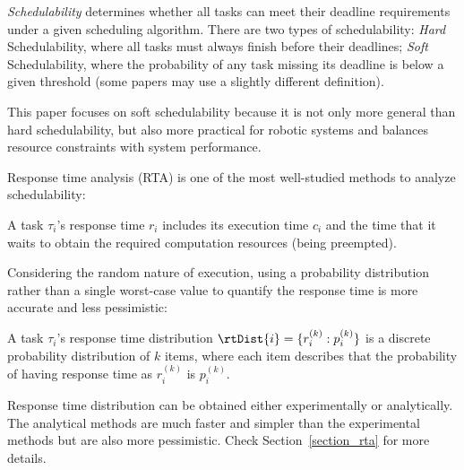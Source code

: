     \textit{Schedulability} determines whether all tasks can meet their deadline requirements under a given scheduling algorithm.
    There are two types of schedulability: \textit{Hard} Schedulability, where all tasks must always finish before their deadlines;
    \textit{Soft} Schedulability, where the probability of any task missing its deadline is below a given threshold (some papers may use a slightly different definition).
    
	This paper focuses on soft schedulability because it is not only more general than hard schedulability, but also more practical for robotic systems and balances resource constraints with system performance.
    
	
	Response time analysis (RTA) is one of the most well-studied methods to analyze schedulability:
	\begin{definition}
		A task $\tau_i$'s response time $r_i$ includes its execution time $c_i$ and the time that it waits to obtain the required computation resources (\eg being preempted).
	\end{definition}
	Considering the random nature of execution, using a probability distribution rather than a single worst-case value to quantify the response time is more accurate and less pessimistic:
	\begin{definition}
		A task $\tau_i$'s response time distribution $\rtDist{i} = \{r_i^{(k)}: p_i^{(k)}\}$ is a discrete probability distribution of $k$ items, where each item describes that the probability of having response time as $r_i^{(k)}$ is $p_i^{(k)}$.
	\end{definition}
    
	Response time distribution can be obtained either experimentally or analytically. 
	The analytical methods are much faster and simpler than the experimental methods but are also more pessimistic. 
	Check Section~\ref{section_rta} for more details.
	
	